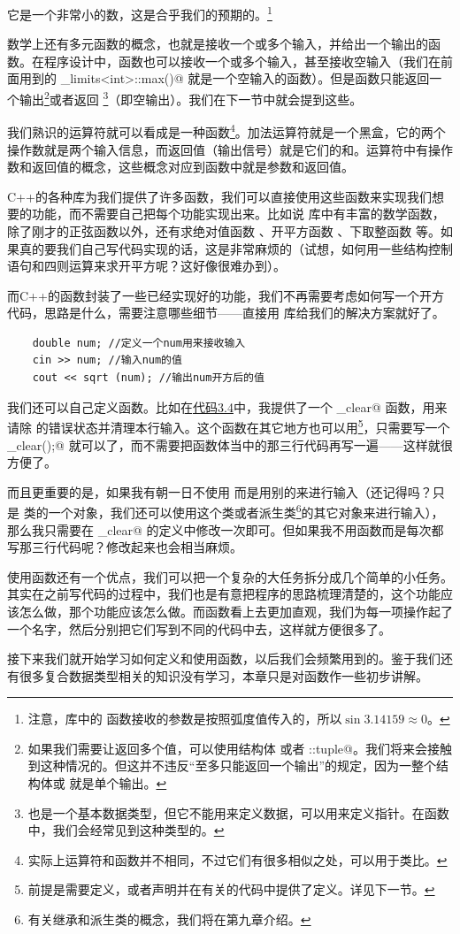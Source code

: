 它是一个非常小的数，这是合乎我们的预期的。\footnote{注意，\lstinline@cmath@ 库中的 \lstinline@sin@ 函数接收的参数是按照弧度值传入的，所以$\sin3.14159\approx0$。}\par
数学上还有多元函数的概念，也就是接收一个或多个输入，并给出一个输出的函数。在程序设计中，函数也可以接收一个或多个输入，甚至接收空输入（我们在前面用到的 \lstinline@numeric_limits<int>::max()@ 就是一个空输入的函数）。但是函数只能返回一个输出\footnote{如果我们需要让返回多个值，可以使用结构体 \lstinline@struct@ 或者 \lstinline@std::tuple@。我们将来会接触到这种情况的。但这并不违反``至多只能返回一个输出''的规定，因为一整个结构体或 \lstinline@tuple@ 就是单个输出。}或者返回 \lstinline@void@\footnote{\lstinline@void@ 也是一个基本数据类型，但它不能用来定义数据，可以用来定义指针。在函数中，我们会经常见到这种类型的。}（即空输出）。我们在下一节中就会提到这些。\par
我们熟识的运算符就可以看成是一种函数\footnote{实际上运算符和函数并不相同，不过它们有很多相似之处，可以用于类比。}。加法运算符就是一个黑盒，它的两个操作数就是两个输入信息，而返回值（输出信号）就是它们的和。运算符中有操作数和返回值的概念，这些概念对应到函数中就是参数和返回值。\par
C++的各种库为我们提供了许多函数，我们可以直接使用这些函数来实现我们想要的功能，而不需要自己把每个功能实现出来。比如说 \lstinline@cmath@ 库中有丰富的数学函数，除了刚才的正弦函数以外，还有求绝对值函数 \lstinline@abs@、开平方函数 \lstinline@sqrt@、下取整函数 \lstinline@floor@ 等。如果真的要我们自己写代码实现的话，这是非常麻烦的（试想，如何用一些结构控制语句和四则运算来求开平方呢？这好像很难办到）。\par
而C++的函数封装了一些已经实现好的功能，我们不再需要考虑如何写一个开方代码，思路是什么，需要注意哪些细节——直接用 \lstinline@cmath@ 库给我们的解决方案就好了。
\begin{lstlisting}
    double num; //定义一个num用来接收输入
    cin >> num; //输入num的值
    cout << sqrt (num); //输出num开方后的值
\end{lstlisting}\par
我们还可以自己定义函数。比如在\hyperref[lst:SumWithContinue]{代码3.4}中，我提供了一个 \lstinline@input_clear@ 函数，用来请除 \lstinline@cin@ 的错误状态并清理本行输入。这个函数在其它地方也可以用\footnote{前提是需要定义，或者声明并在有关的代码中提供了定义。详见下一节。}，只需要写一个 \lstinline@input_clear();@ 就可以了，而不需要把函数体当中的那三行代码再写一遍——这样就很方便了。\par
而且更重要的是，如果我有朝一日不使用 \lstinline@cin@ 而是用别的来进行输入（还记得吗？\lstinline@cin@ 只是 \lstinline@istream@ 类的一个对象，我们还可以使用这个类或者派生类\footnote{有关继承和派生类的概念，我们将在第九章介绍。}的其它对象来进行输入），那么我只需要在 \lstinline@input_clear@ 的定义中修改一次即可。但如果我不用函数而是每次都写那三行代码呢？修改起来也会相当麻烦。\par
使用函数还有一个优点，我们可以把一个复杂的大任务拆分成几个简单的小任务。其实在之前写代码的过程中，我们也是有意把程序的思路梳理清楚的，这个功能应该怎么做，那个功能应该怎么做。而函数看上去更加直观，我们为每一项操作起了一个名字，然后分别把它们写到不同的代码中去，这样就方便很多了。\par
接下来我们就开始学习如何定义和使用函数，以后我们会频繁用到的。鉴于我们还有很多复合数据类型相关的知识没有学习，本章只是对函数作一些初步讲解。\par

